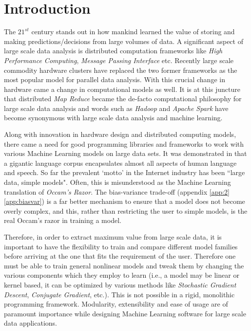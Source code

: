 \chapter{Introduction}
\label{cha:intro}
The $21^{st}$ century stands out in how mankind learned the value of storing and making predictions/decisions from large volumes of data. A significant aspect of large scale data analysis is distributed computation frameworks like \textit{High Performance Computing}, \textit{Message Passing Interface} etc. Recently large scale commodity hardware clusters have replaced the two former frameworks as the most popular model for parallel data analysis. With this crucial change in hardware came a change in computational models as well. It is at this juncture that distributed \textit{Map Reduce} became the de-facto computational philosophy for large scale data analysis and  words such as \textit{Hadoop} \cite{Hadoop:2005, chang2008bigtable, Borthakur2011} and \textit{Apache Spark} \cite{Zaharia2010, Spark:2010} have become synonymous with large scale data analysis and machine learning.

Along with innovation in hardware design and distributed computing models, there came a need for good programming libraries and frameworks to work with various Machine Learning models on large data sets. It was demonstrated in \cite{10.1109/MIS.2009.36} that a gigantic language corpus encapsulates almost all aspects of human language and speech. So far the prevalent `motto' in the Internet industry has been ``large data, simple models". Often, this is misunderstood as the Machine Learning translation of \textit{Occam's Razor}. The bias-variance trade-off \cite{Valentini2004} (appendix \ref{app:2} \ref{app:biasvar}) is a far better mechanism to ensure that a model does not become overly complex, and this, rather than restricting the user to simple models, is the real Occam's razor in training a model. 

Therefore, in order to extract maximum value from large scale data, it is important to have the flexibility to train and compare different model families before arriving at the one that fits the requirement of the user. Therefore one must be able to train general nonlinear models and tweak them by changing the various components which they employ to learn (i.e., a model may be linear or kernel based, it can be optimized by various methods like \textit{Stochastic Gradient Descent}, \textit{Conjugate Gradient}, etc.). This is not possible in a rigid, monolithic programming framework. Modularity, extensibility and ease of usage are of paramount importance while designing Machine Learning software for large scale data applications.

